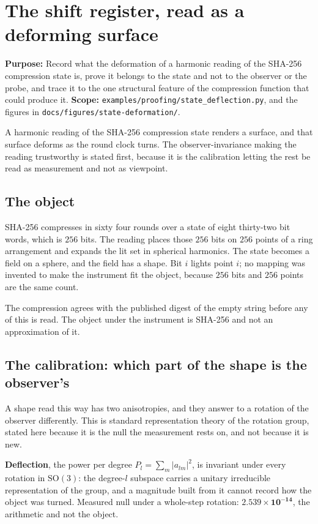 \chapter{The shift register, read as a deforming surface}

\textbf{Purpose:} Record what the deformation of a harmonic reading of the SHA-256 compression state is, prove it belongs to the state and not to the observer or the probe, and trace it to the one structural feature of the compression function that could produce it. \textbf{Scope:} \texttt{examples/\allowbreak{}proofing/\allowbreak{}state\_deflection.py}, and the figures in \texttt{docs/\allowbreak{}figures/\allowbreak{}state-deformation/}.

A harmonic reading of the SHA-256 compression state renders a surface, and that surface deforms as the round clock turns. The observer-invariance making the reading trustworthy is stated first, because it is the calibration letting the rest be read as measurement and not as viewpoint.

\section{The object}

SHA-256 compresses in sixty four rounds over a state of eight thirty-two bit words, which is \(256\) bits. The reading places those \(256\) bits on \(256\) points of a ring arrangement and expands the lit set in spherical harmonics. The state becomes a field on a sphere, and the field has a shape. Bit \(i\) lights point \(i\); no mapping was invented to make the instrument fit the object, because \(256\) bits and \(256\) points are the same count.

The compression agrees with the published digest of the empty string before any of this is read. The object under the instrument is SHA-256 and not an approximation of it.

\section{The calibration: which part of the shape is the observer's}

A shape read this way has two anisotropies, and they answer to a rotation of the observer differently. This is standard representation theory of the rotation group, stated here because it is the null the measurement rests on, and not because it is new.

\textbf{Deflection}, the power per degree \(P_l = \sum_m |a_{lm}|^2\), is invariant under every rotation in \(\mathrm{SO}(3)\): the degree-\(l\) subspace carries a unitary irreducible representation of the group, and a magnitude built from it cannot record how the object was turned. Measured null under a whole-step rotation: \(\mathbf{2.539 \times 10^{-14}}\), the arithmetic and not the object.

